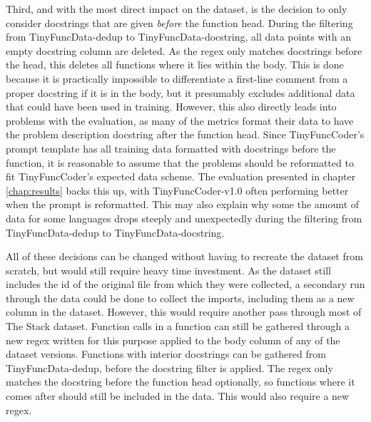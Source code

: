 Third, and with the most direct impact on the dataset, is the decision to only consider docstrings that are given \emph{before} the function head.
During the filtering from TinyFuncData-dedup to TinyFuncData-docstring, all data points with an empty docstring column are deleted.
As the \ac{regex} only matches docstrings before the head, this deletes all functions where it lies within the body.
This is done because it is practically impossible to differentiate a first-line comment from a proper docstring if it is in the body, but it presumably excludes additional data that could have been used in training.
However, this also directly leads into problems with the evaluation, as many of the metrics format their data to have the problem description docstring after the function head.
Since TinyFuncCoder's prompt template has all training data formatted with docstrings before the function, it is reasonable to assume that the problems should be reformatted to fit TinyFuncCoder's expected data scheme.
The evaluation presented in chapter \ref{chap:results} backs this up, with TinyFuncCoder-v1.0 often performing better when the prompt is reformatted.
This may also explain why some the amount of data for some languages drops steeply and unexpectedly during the filtering from TinyFuncData-dedup to TinyFuncData-docstring.

All of these decisions can be changed without having to recreate the dataset from scratch, but would still require heavy time investment.
As the dataset still includes the id of the original file from which they were collected, a secondary run through the data could be done to collect the imports, including them as a new column in the dataset.
However, this would require another pass through most of The Stack dataset.
Function calls in a function can still be gathered through a new \ac{regex} written for this purpose applied to the body column of any of the dataset versions.
Functions with interior docstrings can be gathered from TinyFuncData-dedup, before the docstring filter is applied.
The \ac{regex} only matches the docstring before the function head optionally, so functions where it comes after should still be included in the data.
This would also require a new \ac{regex}.

